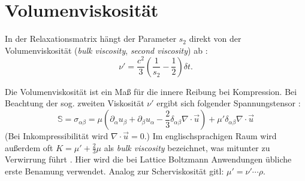\documentclass[a4paper,10pt]{scrreprt}
\begin{document}
\section{Volumenviskosität}
In der Relaxationsmatrix hängt der Parameter $s_2$ direkt von der Volumenviskosität (\emph{bulk viscosity}, \emph{second viscosity}) ab \cite{Guo2013}:
\begin{equation}
 \nu' = \frac{c^2}{3} \left( \frac{1}{s_2} - \frac{1}{2} \right)  \delta t.
\end{equation}

Die Volumenviskosität ist ein Maß für die innere Reibung bei Kompression. 
Bei Beachtung der sog. zweiten Viskosität $\nu'$ ergibt sich folgender Spannungstensor \cite{Dellar2001}:
\begin{equation}
\label{eq:Spannungsmatrix}
 \mathbb{S} = \sigma_{\alpha \beta} = \mu \left( \partial_{\alpha} u_{\beta} + \partial_{\beta} u_{\alpha} - \frac{2}{3} \delta_{\alpha \beta} \nabla \cdot \vec{u} \right) + \mu' \delta_{\alpha \beta} \nabla \cdot \vec{u}
\end{equation}
(Bei Inkompressibilität wird $\nabla \cdot \vec{u} = 0$.)
Im englischsprachigen Raum wird außerdem oft $K = \mu' + \frac{2}{3} \mu$ als \emph{bulk viscosity} bezeichnet, was mitunter zu Verwirrung führt \cite{Rosenhead1954}.
Hier wird die bei Lattice Boltzmann Anwendungen übliche erste Benamung verwendet.
Analog zur Scherviskosität gitl: $\mu' = \nu' \cdots \rho$.
\end{document}
